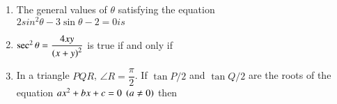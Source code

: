 \documentclass[journal,12pt,twocolumn]{IEEEtran}
\theoremstyle{remark}
\begin{document}
\begin{enumerate}
    \item The general values of $\theta$ satisfying the equation\\$2sin^2{\theta}-3\sin{\theta}-2=0 is$
        
        \begin{enumerate}[label={(\alph*)}]

        \end{enumerate}

    \item $\sec^2{\theta} = \dfrac{4xy}{\left(x+y\right)^2}$ is true if and only if
        
        \begin{enumerate}[label={(\alph*)}]

        \end{enumerate}
        
    \item In a triangle $PQR$, $\angle R = \dfrac{\pi}{2}$. If $\tan{P/2}$ and $\tan{Q/2}$ are the roots of the equation $ax^2+bx+c=0 \;\left(a\neq0\right)$ then
        

\end{enumerate}
\end{document}
